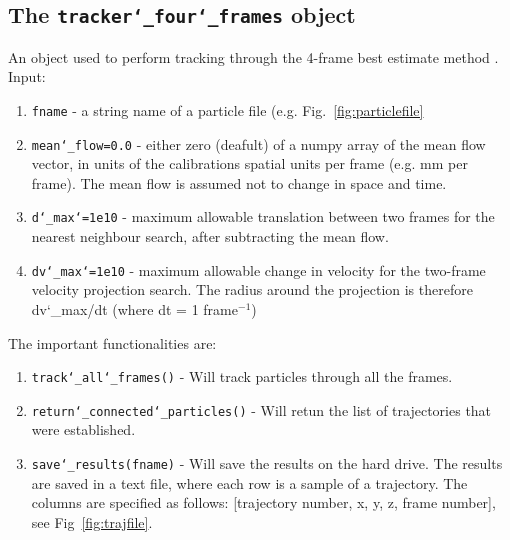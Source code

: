 \documentclass[10pt,a4paper]{article}
\begin{document}
\subsection{The \texttt{tracker\char`_four\char`_frames} object}\label{sec:four_frames}

An object used to perform tracking through the 4-frame best estimate method \cite{Ouellette2006}. Input:
%
\begin{enumerate}
	\item \texttt{fname} - a string name of a particle file (e.g. Fig.~\ref{fig:particlefile}
	\item \texttt{mean\char`_flow=0.0} - either zero (deafult) of a numpy array of the mean flow vector, in units of the calibrations spatial units per frame (e.g. mm per frame). The mean flow is assumed not to change in space and time.
	\item \texttt{d\char`_max\char`=1e10} - maximum allowable translation between two frames for the nearest neighbour search, after subtracting the mean flow. 
	\item \texttt{dv\char`_max\char`=1e10} - maximum allowable change in velocity for the two-frame velocity projection search. The radius around the projection is therefore dv\char`_max/dt (where dt = 1 frame$^{-1}$)
\end{enumerate}


The important functionalities are:
%
\begin{enumerate}
	\item \texttt{track\char`_all\char`_frames()} - Will track particles through all the frames. 
	
	\item \texttt{return\char`_connected\char`_particles()} - Will retun the list of trajectories that were established.
	
	\item \texttt{save\char`_results(fname)} - Will save the results on the hard drive. The results are saved in a text file, where each row is a sample of a trajectory. The columns are specified as follows: [trajectory number, x, y, z, frame number], see Fig~\ref{fig:trajfile}.  
\end{enumerate}
\end{document}
